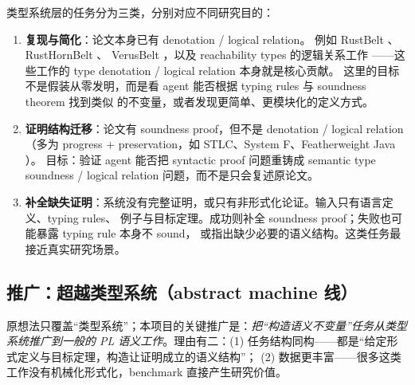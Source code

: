 类型系统层的任务分为三类，分别对应不同研究目的：

\begin{enumerate}
  \item \textbf{复现与简化}：论文本身已有 denotation / logical relation。
        例如 RustBelt \citep{Jung2018RustBelt}、RustHornBelt \citep{Matsushita2022RustHornBelt}、
        VerusBelt \citep{Hance2026VerusBelt}，以及 reachability types 的逻辑关系工作
        \citep{Bao2025ReachabilityLR}——这些工作的 type denotation / logical relation 本身就是核心贡献。
        这里的目标不是假装从零发明，而是看 agent 能否根据 typing rules 与 soundness theorem 找到类似
        的不变量，或者发现更简单、更模块化的定义方式。
  \item \textbf{证明结构迁移}：论文有 soundness proof，但不是 denotation / logical relation
        （多为 progress + preservation，如 STLC、System F、Featherweight Java \citep{Igarashi2001FJ}）。
        目标：验证 agent 能否把 syntactic proof 问题重铸成 semantic type soundness / logical relation
        问题，而不是只会复述原论文。
  \item \textbf{补全缺失证明}：系统没有完整证明，或只有非形式化论证。输入只有语言定义、typing rules、
        例子与目标定理。成功则补全 soundness proof；失败也可能暴露 typing rule 本身不 sound，
        或指出缺少必要的语义结构。这类任务最接近真实研究场景。
\end{enumerate}

\subsection{推广：超越类型系统（abstract machine 线）}
\label{sec:machine-line}

原想法只覆盖``类型系统''；本项目的关键推广是：\emph{把``构造语义不变量''任务从类型系统推广到一般的
PL 语义工作}。理由有二：(1) 任务结构同构——都是``给定形式定义与目标定理，构造让证明成立的语义结构''；
(2) 数据更丰富——很多这类工作没有机械化形式化，benchmark 直接产生研究价值。

